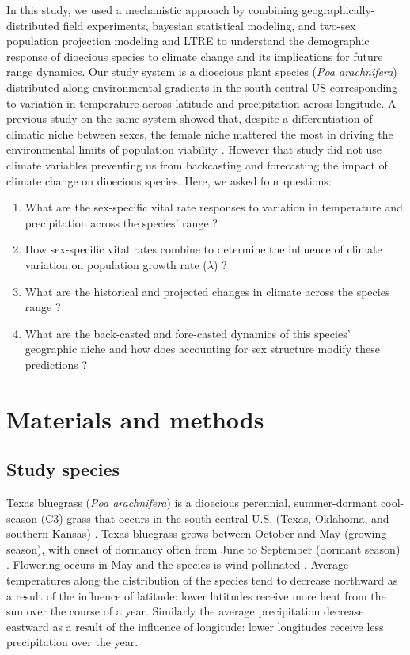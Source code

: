\documentclass[12pt]{article}
\begin{document}
In this study, we used a mechanistic approach by combining geographically-distributed field experiments, bayesian statistical modeling, and two-sex population projection modeling and LTRE to understand the demographic response of dioecious species to climate change and its implications for future range dynamics.
Our study system is a dioecious plant species (\textit{Poa arachnifera}) distributed along environmental gradients in the south-central US corresponding to variation in temperature across latitude and precipitation across longitude. 
A previous study on the same system showed that, despite a differentiation of climatic niche between sexes, the female niche mattered the most in driving the environmental limits of population viability \citep{miller2022two}.
However that study did not use climate variables preventing us from backcasting and forecasting the impact of climate change on dioecious species.
Here, we asked four questions: 
\begin{enumerate}
	\item What are the sex-specific vital rate responses to variation in temperature and precipitation across the species' range ?
	\item How sex-specific vital rates combine to determine the influence of climate variation on population growth rate ($\lambda$) ?
	\item What are the historical and projected changes in climate across the species range ?
	\item What are the back-casted and fore-casted dynamics of this species' geographic niche and how does accounting for sex structure modify these predictions ?
\end{enumerate}

\section*{Materials and methods}
\subsection*{Study species}
Texas bluegrass (\textit{Poa arachnifera}) is a dioecious perennial, summer-dormant cool-season (C3) grass that occurs in the south-central U.S. (Texas, Oklahoma, and southern Kansas) \citep{hitchcock1971manual}. 
Texas bluegrass grows between October and May (growing season), with onset of dormancy often from June to September (dormant season) \citep{kindiger2004interspecific}.
Flowering occurs in May and the species is wind pollinated \citep{hitchcock1971manual}.
Average temperatures along the distribution of the species tend to decrease northward as a result of the influence of latitude: lower latitudes receive more heat from the sun over the course of a year.
Similarly the average precipitation decrease eastward as a result of the influence of longitude: lower longitudes receive less precipitation over the year.
\end{document}

